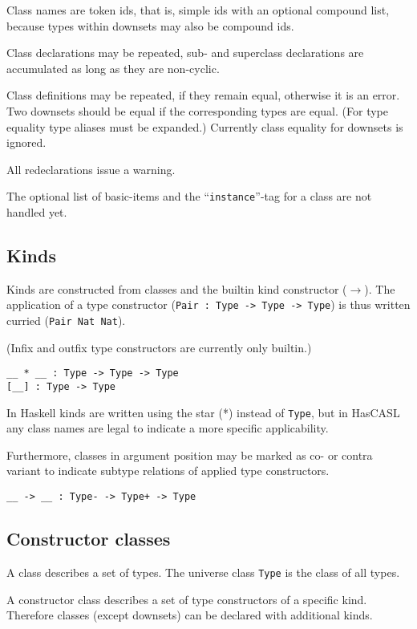 \documentclass{article}
\begin{document}
Class names are token ids, that is, simple ids with an optional compound list,
because types within downsets may also be compound ids.

Class declarations may be repeated, sub- and superclass declarations are
accumulated as long as they are non-cyclic.

Class definitions may be repeated, if they remain equal, otherwise it is an
error. Two downsets should be equal if the corresponding types are equal. (For
type equality type aliases must be expanded.) Currently class equality for
downsets is ignored.

All redeclarations issue a warning. 

The optional list of basic-items and the ``\texttt{instance}''-tag for a class
are not handled yet.

\subsection{Kinds}

Kinds are constructed from classes and the builtin kind constructor ($\to$).
The application of a type constructor (\texttt{Pair : Type -> Type -> Type})
is thus written curried (\texttt{Pair Nat Nat}). 

(Infix and outfix type constructors are currently only builtin.)

\begin{verbatim}
__ * __ : Type -> Type -> Type
[__] : Type -> Type
\end{verbatim}

In Haskell kinds are written using the star (*) instead of \texttt{Type}, but
in HasCASL any class names are legal to indicate a more specific
applicability. 

Furthermore, classes in argument position may be marked as co- or contra
variant to indicate subtype relations of applied type constructors.

\begin{verbatim}
__ -> __ : Type- -> Type+ -> Type
\end{verbatim}

\subsection{Constructor classes}

A class describes a set of types. The universe class \texttt{Type} is the
class of all types. 

A constructor class describes a set of type constructors
of a specific kind. Therefore classes (except downsets) can be declared with
additional kinds. 
\end{document}
